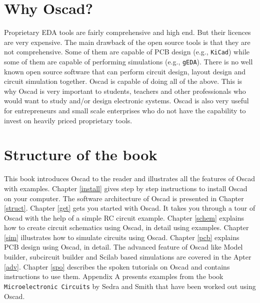 \section{Why Oscad?}
Proprietary EDA tools are fairly comprehensive and high end. But their licences are very expensive. The main drawback of the open source tools is that they are not comprehensive. Some of them are capable of PCB design (e.g., {\tt KiCad}) while some of them are capable of performing simulations (e.g., {\tt gEDA}). There is no well known open source software that can perform circuit design, layout design and circuit simulation together. Oscad is capable of doing all of the above. This is why Oscad is very important to students, teachers and other professionals who would want to study and/or design electronic systems. Oscad is also very useful for entrepreneurs and small scale enterprises who do not have the capability to invest on heavily priced proprietary tools.
\section{Structure of the book}
This book introduces Oscad to the reader and illustrates all the features of Oscad with examples. Chapter \ref{install} gives step by step instructions to install Oscad on your computer. The software architecture of Oscad is presented in Chapter \ref{struct}. 
 Chapter \ref{get} gets you started with Oscad. It takes you through a tour of Oscad with the help of a simple RC circuit example. Chapter \ref{schem} explains how to create circuit schematics using Oscad, in detail using examples. Chapter \ref{sim} illustrates how to simulate circuits using Oscad. Chapter \ref{pcb} explains PCB design using Oscad, in detail. The advanced feature of Oscad like Model builder, subcircuit builder and Scilab based simulations are covered in the Apter \ref{adv}. Chapter \ref{spo} describes the spoken tutorials on Oscad and contains instructions to use them. Appendix A presents examples from the book {\tt Microelectronic Circuits} by Sedra and Smith that have been worked out using Oscad.









%
